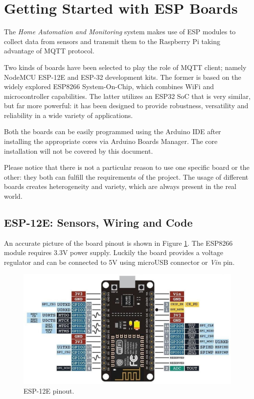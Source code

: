 \section{Getting Started with ESP Boards}
The \textit{Home Automation and Monitoring} system makes use of ESP modules to collect data from sensors and transmit them to the Raspberry Pi taking advantage of MQTT protocol.

Two kinds of boards have been selected to play the role of MQTT client; namely NodeMCU ESP-12E and ESP-32 development kits. The former is based on the widely explored ESP8266 System-On-Chip, which combines WiFi and microcontroller capabilities. The latter utilizes an ESP32 SoC that is very similar, but far more powerful: it has been designed to provide robustness, versatility and reliability in a wide variety of applications.

Both the boards can be easily programmed using the Arduino IDE after installing the appropriate cores via Arduino Boards Manager. The core installation will not be covered by this document.

Please notice that there is not a particular reason to use one specific board or the other: they both can fulfill the requirements of the project. The usage of different boards creates heterogeneity and variety, which are always present in the real world. 

\subsection{ESP-12E: Sensors, Wiring and Code}
\label{esp12_getting_started}
An accurate picture of the board pinout is shown in Figure \ref{esp12_pinout}. The ESP8266 module requires 3.3V power supply. Luckily the board provides a voltage regulator and can be connected to 5V using microUSB connector or \textit{Vin} pin.

\begin{figure}[H]
	\begin{center}
		\includegraphics[width=\textwidth]{./pictures/ESP-12E_pinout.JPG}
		\caption{ESP-12E pinout.}
		\label{esp12_pinout}
	\end{center}
\end{figure}

